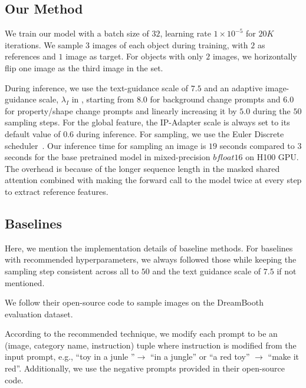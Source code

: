 \subsection{Our Method}
We train our model with a batch size of $32$, learning rate $1\times 10^{-5}$ for $20K$ iterations. We sample $3$ images of each object during training, with $2$ as references and $1$ image as target. For objects with only $2$ images, we horizontally flip one image as the third image in the set.

During inference, we use the text-guidance scale of $7.5$ and an adaptive image-guidance scale, $\lambda_{I}$ in , starting from $8.0$ for background change prompts and $6.0$ for property/shape change prompts and linearly increasing it by $5.0$ during the $50$ sampling steps. For the global feature, the IP-Adapter scale is always set to its default value of $0.6$ during inference. For sampling, we use the Euler Discrete scheduler~\cite{karras2022elucidating}. Our inference time for sampling an image is $19$ seconds compared to $3$ seconds for the base pretrained model in mixed-precision $bfloat16$ on H100 GPU. The overhead is because of the longer sequence length in the masked shared attention combined with making the forward call to the model twice at every step to extract reference features. 





\subsection{Baselines}
Here, we mention the implementation details of baseline methods. For baselines with recommended hyperparameters, we always followed those while keeping the sampling step consistent across all to $50$ and the text guidance scale of $7.5$ if not mentioned. 

 We follow their open-source code to sample images on the DreamBooth evaluation dataset.

 According to the recommended technique, we modify each prompt to be an (image, category name, instruction) tuple where instruction is modified from the input prompt, e.g., ``{\menlo toy in a junle} ''$\rightarrow$ ``{\menlo in a jungle}'' or ``{\menlo a red toy}'' $\rightarrow$ ``{\menlo make it red}''. Additionally, we use the negative prompts provided in their open-source code. 

